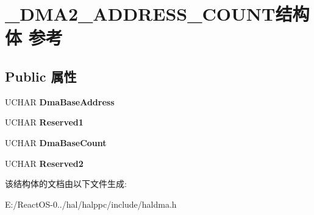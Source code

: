 \hypertarget{struct___d_m_a2___a_d_d_r_e_s_s___c_o_u_n_t}{}\section{\+\_\+\+D\+M\+A2\+\_\+\+A\+D\+D\+R\+E\+S\+S\+\_\+\+C\+O\+U\+N\+T结构体 参考}
\label{struct___d_m_a2___a_d_d_r_e_s_s___c_o_u_n_t}
\subsection*{Public 属性}
\begin{DoxyCompactItemize}
\item 
\mbox{\label{struct___d_m_a2___a_d_d_r_e_s_s___c_o_u_n_t_a583afae8231a77c58d96478d88fed9a1}} 
U\+C\+H\+AR {\bfseries Dma\+Base\+Address}
\item 
\mbox{\label{struct___d_m_a2___a_d_d_r_e_s_s___c_o_u_n_t_ae0888fa68f81768b4e5630cef7ef209d}} 
U\+C\+H\+AR {\bfseries Reserved1}
\item 
\mbox{\label{struct___d_m_a2___a_d_d_r_e_s_s___c_o_u_n_t_afcbe1ab158d0270c07cfab12a80da3fe}} 
U\+C\+H\+AR {\bfseries Dma\+Base\+Count}
\item 
\mbox{\label{struct___d_m_a2___a_d_d_r_e_s_s___c_o_u_n_t_a660f1678f5eb650bf085ee864a0acdab}} 
U\+C\+H\+AR {\bfseries Reserved2}
\end{DoxyCompactItemize}


该结构体的文档由以下文件生成\+:\begin{DoxyCompactItemize}
\item 
E\+:/\+React\+O\+S-\/0../hal/halppc/include/haldma.\+h\end{DoxyCompactItemize}
